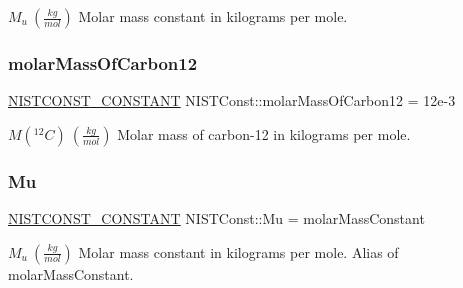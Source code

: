 $M_u \ (\frac{kg}{mol})$ Molar mass constant in kilograms per mole. \mbox{\label{group___n_i_s_t_const-_molar_mass_constant_gad9065879bcb5df86d887c5c547b7ab17}} 
\subsubsection{\texorpdfstring{molar\+Mass\+Of\+Carbon12}{molarMassOfCarbon12}}
{\footnotesize\ttfamily \mbox{\hyperlink{group___n_i_s_t_const-_macros_ga2b0fc1d7452373f816175dd86ce26729}{N\+I\+S\+T\+C\+O\+N\+S\+T\+\_\+\+C\+O\+N\+S\+T\+A\+NT}} N\+I\+S\+T\+Const\+::molar\+Mass\+Of\+Carbon12 = 12e-\/3}

$M({^{12}C}) \ (\frac{kg}{mol})$ Molar mass of carbon-\/12 in kilograms per mole. \mbox{\label{group___n_i_s_t_const-_molar_mass_constant_gaa02db2096b35ba17b364c95c59d4b800}} 
\subsubsection{\texorpdfstring{Mu}{Mu}}
{\footnotesize\ttfamily \mbox{\hyperlink{group___n_i_s_t_const-_macros_ga2b0fc1d7452373f816175dd86ce26729}{N\+I\+S\+T\+C\+O\+N\+S\+T\+\_\+\+C\+O\+N\+S\+T\+A\+NT}} N\+I\+S\+T\+Const\+::\+Mu = molar\+Mass\+Constant}

$M_u \ (\frac{kg}{mol})$ Molar mass constant in kilograms per mole. Alias of molar\+Mass\+Constant. 